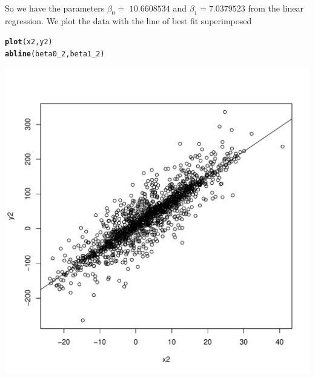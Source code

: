 \documentclass{article}\usepackage[]{graphicx}\usepackage[]{color}
\makeatletter
\def\maxwidth{ %
  \ifdim\Gin@nat@width>\linewidth
    \linewidth
  \else
    \Gin@nat@width
  \fi
}
\newcommand{\hlstd}[1]{\textcolor[rgb]{0.345,0.345,0.345}{#1}}%
\newcommand{\hlkwd}[1]{\textcolor[rgb]{0.737,0.353,0.396}{\textbf{#1}}}%
\newenvironment{kframe}{%
 \def\at@end@of@kframe{}%
 \ifinner\ifhmode%
  \def\at@end@of@kframe{\end{minipage}}%
  \begin{minipage}{\columnwidth}%
 \fi\fi%
 \def\FrameCommand##1{\hskip\@totalleftmargin \hskip-\fboxsep
 \colorbox{shadecolor}{##1}\hskip-\fboxsep
     \hskip-\linewidth \hskip-\@totalleftmargin \hskip\columnwidth}%
 \MakeFramed {\advance\hsize-\width
   \@totalleftmargin\z@ \linewidth\hsize
   \@setminipage}}%
 {\par\unskip\endMakeFramed%
 \at@end@of@kframe}
\newenvironment{knitrout}{}{} %
\makeatother
\begin{document}
So we have the parameters $\beta_0 = $ $10.6608534$ and $\beta_1 = 7.0379523$ from the linear regression. We plot the data with the line of best fit superimposed
\begin{knitrout}
\color{fgcolor}\begin{kframe}
\begin{alltt}
\hlkwd{plot}\hlstd{(x2,y2)}
\hlkwd{abline}\hlstd{(beta0_2, beta1_2)}
\end{alltt}
\end{kframe}
\includegraphics[width=\maxwidth]{figure/unnamed-chunk-4-1} 

\end{knitrout}


\clearpage
\end{document}
